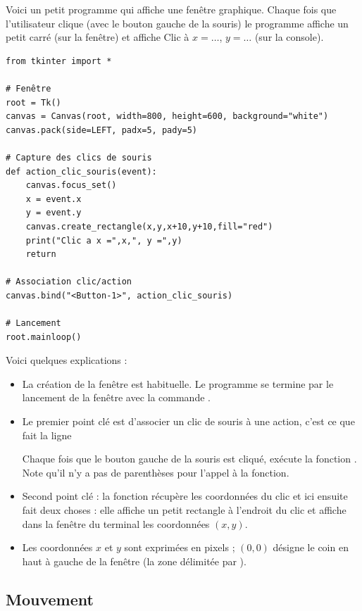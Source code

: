 \documentclass[11pt,class=report,crop=false]{standalone}
\begin{document}
Voici un petit programme qui affiche une fenêtre graphique. Chaque fois que l'utilisateur clique (avec le bouton gauche de la souris) le programme affiche un petit carré (sur la fenêtre) et affiche \og{}Clic à $x=\ldots$, $y=\ldots$\fg{} (sur la console). 

\begin{lstlisting}
from tkinter import *

# Fenêtre
root = Tk()
canvas = Canvas(root, width=800, height=600, background="white")
canvas.pack(side=LEFT, padx=5, pady=5)

# Capture des clics de souris
def action_clic_souris(event):
    canvas.focus_set()
    x = event.x
    y = event.y
    canvas.create_rectangle(x,y,x+10,y+10,fill="red")
    print("Clic a x =",x,", y =",y)
    return

# Association clic/action
canvas.bind("<Button-1>", action_clic_souris)

# Lancement
root.mainloop()
\end{lstlisting}


Voici quelques explications :
\begin{itemize}
  \item La création de la fenêtre est habituelle. Le programme se termine par le lancement de la fenêtre avec la commande .
  
  \item Le premier point clé est d'associer un clic de souris à une action, c'est ce que fait la ligne \\
\centerline{}
Chaque fois que le bouton gauche de la souris est cliqué, \Python{} exécute la fonction . Note qu'il n'y a pas de parenthèses pour l'appel à la fonction.

   \item Second point clé : la fonction  récupère les coordonnées du clic et ici ensuite fait deux choses : elle affiche un petit rectangle à l'endroit du clic et affiche dans la fenêtre du terminal les coordonnées $(x,y)$.
   
   \item Les coordonnées $x$ et $y$ sont exprimées en pixels ; $(0,0)$ désigne le coin en haut à gauche de la fenêtre (la zone délimitée par ).
\end{itemize}

\subsection{Mouvement}
\end{document}
